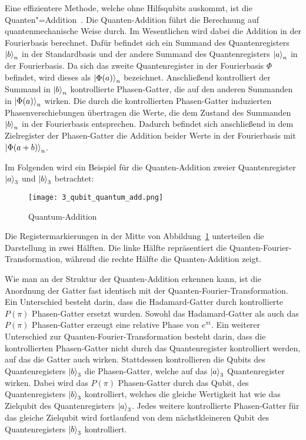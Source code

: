 Eine effizientere Methode, welche ohne Hilfsqubits auskommt, ist die Quanten"=Addition~\cite{draper2000addition}. 
Die Quanten-Addition führt die Berechnung auf quantenmechanische Weise durch. 
Im Wesentlichen wird dabei die Addition in der Fourierbasis berechnet. 
Dafür befindet sich ein Summand des Quantenregisters \(\ket{b}_n\) in der Standardbasis und 
der andere Summand des Quantenregisters \(\ket{a}_n\) in der Fourierbasis.
Da sich das zweite Quantenregister in der Fourierbasis \(\Phi\) befindet, 
wird dieses als \(\ket{\Phi(a)}_n\) bezeichnet.
Anschließend kontrolliert der Summand in \(\ket{b}_n\) kontrollierte Phasen-Gatter, 
die auf den anderen Summanden in \(\ket{\Phi(a)}_n\) wirken.
Die durch die kontrollierten Phasen-Gatter induzierten Phasenverschiebungen übertragen die Werte, 
die dem Zustand des Summanden \(\ket{b}_n\) in der Fourierbasis entsprechen.
Dadurch befindet sich anschließend in dem Zielregister der Phasen-Gatter die Addition beider Werte in der Fourierbasis mit \(\ket{\Phi(a+b)}_n\).

Im Folgenden wird ein Beispiel für die Quanten-Addition zweier Quantenregister \(\ket{a}_3\) und \(\ket{b}_3\) betrachtet:
\begin{figure}[H]
    \centering
    \texttt{[image: 3\_qubit\_quantum\_add.png]}
    \caption{Quantum-Addition}
    \label{fig:3_qubit_quantum_add}
  \end{figure}
Die Registermarkierungen in der Mitte von Abbildung~\ref{fig:3_qubit_quantum_add} unterteilen die Darstellung in zwei Hälften.
Die linke Hälfte repräsentiert die Quanten-Fourier-Transformation, 
während die rechte Hälfte die Quanten-Addition zeigt.

Wie man an der Struktur der Quanten-Addition erkennen kann,
ist die Anordnung der Gatter fast identisch mit der Quanten-Fourier-Transformation.
Ein Unterschied besteht darin, 
dass die Hadamard-Gatter durch kontrollierte \(P(\pi)\) Phasen-Gatter ersetzt wurden.
Sowohl das Hadamard-Gatter als auch das \(P(\pi)\) Phasen-Gatter erzeugt eine relative Phase von \(e^{\pi i}\).
Ein weiterer Unterschied zur Quanten-Fourier-Transformation besteht darin, 
dass die kontrollierten Phasen-Gatter nicht durch das Quantenregister kontrolliert werden, 
auf das die Gatter auch wirken.
Stattdessen kontrollieren die Qubits des Quantenregisters \(\ket{b}_3\) die Phasen-Gatter, 
welche auf das \(\ket{a}_3\) Quantenregister wirken.
Dabei wird das \(P(\pi)\) Phasen-Gatter durch das Qubit, des Quantenregisters \(\ket{b}_3\) kontrolliert,
welches die gleiche Wertigkeit hat wie das Zielqubit des Quantenregisters \(\ket{a}_3\).
Jedes weitere kontrollierte Phasen-Gatter für das gleiche Zielqubit 
wird fortlaufend von dem nächstkleineren Qubit des Quantenregisters \(\ket{b}_3\) kontrolliert.


